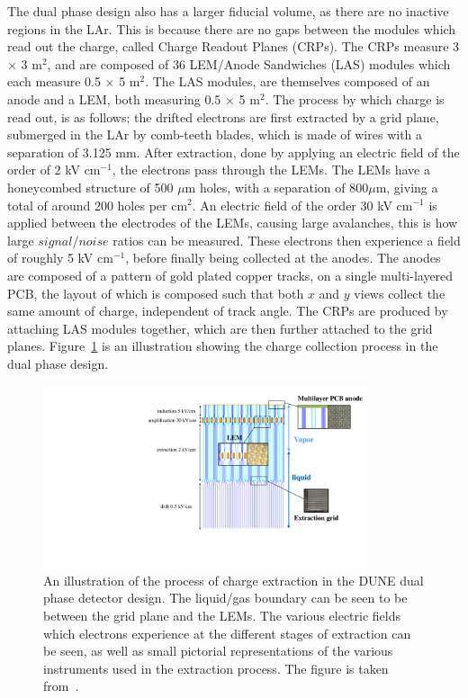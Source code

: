 The dual phase design also has a larger fiducial volume, as there are no inactive regions in the LAr. This is because there are no gaps between the modules which read out the charge, called Charge Readout Planes (CRPs). The CRPs measure 3 $\times$ 3 m$^2$, and are composed of 36 LEM/Anode Sandwiches (LAS) modules which each measure 0.5 $\times$ 5 m$^2$. The LAS modules, are themselves composed of an anode and a LEM, both measuring 0.5 $\times$ 5 m$^2$. The process by which charge is read out, is as follows; the drifted electrons are first extracted by a grid plane, submerged in the LAr by comb-teeth blades, which is made of wires with a separation of 3.125 mm. After extraction, done by applying an electric field of the order of 2 kV cm$^{-1}$, the electrons pass through the LEMs. The LEMs have a honeycombed structure of 500 $\mu$m holes, with a separation of 800$\mu$m, giving a total of around 200 holes per cm$^2$. An electric field of the order 30 kV cm$^{-1}$ is applied between the electrodes of the LEMs, causing large avalanches, this is how large $signal/noise$ ratios can be measured. These electrons then experience a field of roughly 5 kV cm$^{-1}$, before finally being collected at the anodes. The anodes are composed of a pattern of gold plated copper tracks, on a single multi-layered PCB, the layout of which is composed such that both $x$ and $y$ views collect the same amount of charge, independent of track angle. The CRPs are produced by attaching LAS modules together, which are then further attached to the grid planes. Figure~\ref{fig:DUNE_DP_Schem} is an illustration showing the charge collection process in the dual phase design. \\

\begin{figure}
  \centering
  \includegraphics[width=0.85\textwidth]{DualPhasePrinciple}
  \caption[An illustration of the process of charge extraction in the DUNE dual phase detector design]
          {An illustration of the process of charge extraction in the DUNE dual phase detector design. The liquid/gas boundary can be seen to be between the grid plane and the LEMs. The various electric fields which electrons experience at the different stages of extraction can be seen, as well as small pictorial representations of the various instruments used in the extraction process. The figure is taken from~\citep{DUNECDR_V4}.}
  \label{fig:DUNE_DP_Schem}
\end{figure}

